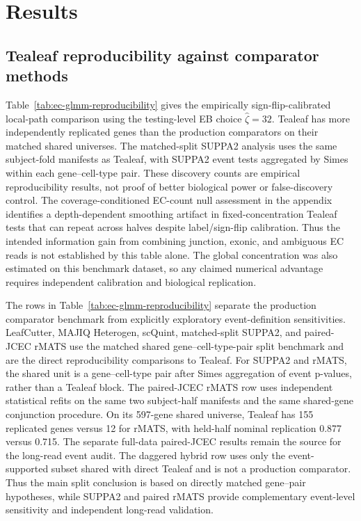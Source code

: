 \documentclass[11pt]{article}
\begin{document}
\section*{Results}

\subsection*{Tealeaf reproducibility against comparator methods}

Table~\ref{tab:ec-glmm-reproducibility} gives the empirically sign-flip-calibrated local-path comparison using the testing-level EB choice \(\widehat\zeta=32\). Tealeaf has more independently replicated genes than the production comparators on their matched shared universes. The matched-split SUPPA2 analysis uses the same subject-fold manifests as Tealeaf, with SUPPA2 event tests aggregated by Simes within each gene--cell-type pair. These discovery counts are empirical reproducibility results, not proof of better biological power or false-discovery control. The coverage-conditioned EC-count null assessment in the appendix identifies a depth-dependent smoothing artifact in fixed-concentration Tealeaf tests that can repeat across halves despite label/sign-flip calibration. Thus the intended information gain from combining junction, exonic, and ambiguous EC reads is not established by this table alone. The global concentration was also estimated on this benchmark dataset, so any claimed numerical advantage requires independent calibration and biological replication.

The rows in Table~\ref{tab:ec-glmm-reproducibility} separate the production comparator benchmark from explicitly exploratory event-definition sensitivities. LeafCutter, MAJIQ Heterogen, scQuint, matched-split SUPPA2, and paired-JCEC rMATS use the matched shared gene--cell-type-pair split benchmark and are the direct reproducibility comparisons to Tealeaf. For SUPPA2 and rMATS, the shared unit is a gene--cell-type pair after Simes aggregation of event p-values, rather than a Tealeaf block. The paired-JCEC rMATS row uses independent statistical refits on the same two subject-half manifests and the same shared-gene conjunction procedure. On its 597-gene shared universe, Tealeaf has 155 replicated genes versus 12 for rMATS, with held-half nominal replication 0.877 versus 0.715. The separate full-data paired-JCEC results remain the source for the long-read event audit. The daggered hybrid row uses only the event-supported subset shared with direct Tealeaf and is not a production comparator. Thus the main split conclusion is based on directly matched gene--pair hypotheses, while SUPPA2 and paired rMATS provide complementary event-level sensitivity and independent long-read validation.
\end{document}
